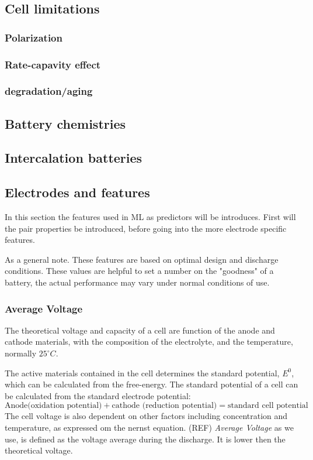 	


\subsection{Cell limitations }
	\subsubsection{Polarization}
	
	\subsubsection{Rate-capavity effect}
	
	\subsubsection{degradation/aging}


\subsection{Battery chemistries}

\subsection{Intercalation batteries}

\subsection{Electrodes and features}
	In this section the features used in ML as predictors will be introduces. First will the pair properties be introduced, before going into the more electrode specific features. 

	As a general note. These features are based on optimal design and discharge conditions. These values are helpful to set a number on the "goodness" of a battery, the actual performance may vary under normal conditions of use. 

	
	\subsubsection*{Average Voltage}
	The theoretical voltage and capacity of a cell are function of the anode and cathode materials, with the composition of the electrolyte, and the temperature, normally $25^\circ\si{C}$.
	
	The active materials contained in the cell determines the standard potential, $E^0$, which can be calculated from the free-energy. 
	The standard potential of a cell can be calculated from the standard electrode potential:
	\begin{equation}
	\text{Anode(oxidation potential)} + \text{cathode (reduction potential)} = \text{standard cell potential}
	\end{equation}  
	The cell voltage is also dependent on other factors including concentration and temperature, as expressed om the nernst equation. (REF)
	\textit{Average Voltage} as we use, is defined as the voltage average during the discharge. It is lower then the theoretical voltage.
	
